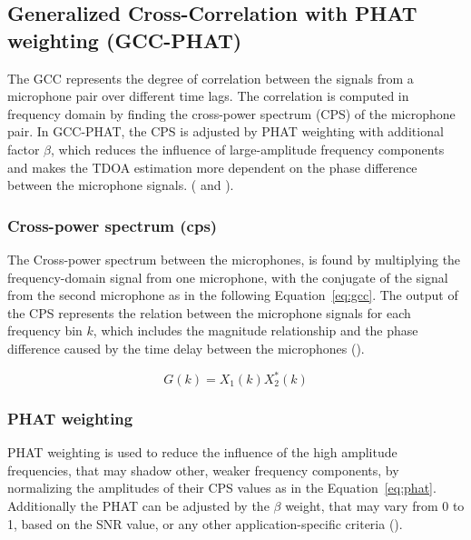     \subsection{Generalized Cross-Correlation with PHAT weighting (GCC-PHAT)}
    \label{sec:gcc}
    The GCC represents the degree of correlation between the signals from a microphone pair over different time lags. The correlation is computed in frequency domain by finding the cross-power spectrum (CPS) of the microphone pair. In GCC-PHAT, the CPS is adjusted by PHAT weighting with additional factor $\beta$, which reduces the influence of large-amplitude frequency components and makes the TDOA estimation more dependent on the phase difference between the microphone signals. %
    (\cite{kang2016prefiltering} and \cite{kwon2010gccphat}).
    
    \subsubsection{Cross-power spectrum (cps)}
    \label{sec:cps}
    The Cross-power spectrum between the microphones, is found by multiplying the frequency-domain signal from one microphone, with the conjugate of the signal from the second microphone as in the following Equation~\ref{eq:gcc}. %
    The output of the CPS represents the relation between the microphone signals for each frequency bin $k$, which includes the magnitude relationship and the phase difference caused by the time delay between the microphones (\cite{kang2016prefiltering}).

    \begin{equation}
    \label{eq:gcc}
        G(k) = X_1(k)X_2^*(k)
    \end{equation}


    \subsubsection{PHAT weighting}
    \label{sec:PHatW}
    PHAT weighting 
    is used to reduce the influence of the high amplitude frequencies, that may shadow other, weaker frequency components, by normalizing the amplitudes of their CPS values as in the Equation~\ref{eq:phat}. Additionally the PHAT can be adjusted by the $\beta$ weight, that may vary from 0 to 1, based on the SNR value, or any other application-specific criteria (\cite{kang2016prefiltering}).       

